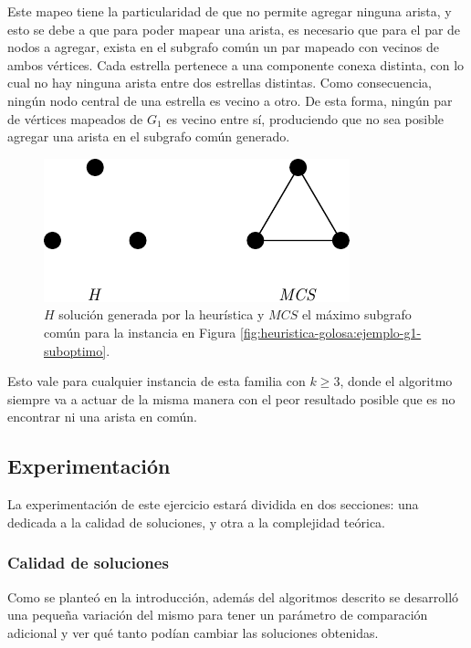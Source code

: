 Este mapeo tiene la particularidad de que no permite agregar ninguna arista, y
esto se debe a que para poder mapear una arista, es necesario que para el par de
nodos a agregar, exista en el subgrafo común un par mapeado con vecinos de ambos
vértices. Cada estrella pertenece a una componente conexa distinta, con lo cual
no hay ninguna arista entre dos estrellas distintas. Como consecuencia, ningún
nodo central de una estrella es vecino a otro. De esta forma, ningún par de
vértices mapeados de $G_1$ es vecino entre sí, produciendo que no sea posible
agregar una arista en el subgrafo común generado.

\begin{figure}[H]
	\centering
	\includegraphics{imagenes/ex4_solution.pdf}
	\caption{$H$ solución generada por la heurística y $MCS$ el máximo subgrafo
	común para la instancia en Figura \ref{fig:heuristica-golosa:ejemplo-g1-suboptimo}.}
	\label{fig:heuristica-golosa:ejemplo-g1-suboptimo-solucion}
\end{figure}

Esto vale para cualquier instancia de esta familia con $k \geq 3$, donde el
algoritmo siempre va a actuar de la misma manera con el peor resultado posible
que es no encontrar ni una arista en común.

\subsection{Experimentación}

La experimentación de este ejercicio estará dividida en dos secciones: una
dedicada a la calidad de soluciones, y otra a la complejidad teórica.

\subsubsection{Calidad de soluciones}

Como se planteó en la introducción, además del algoritmos descrito se desarrolló
una pequeña variación del mismo para tener un parámetro de comparación adicional
y ver qué tanto podían cambiar las soluciones obtenidas.

